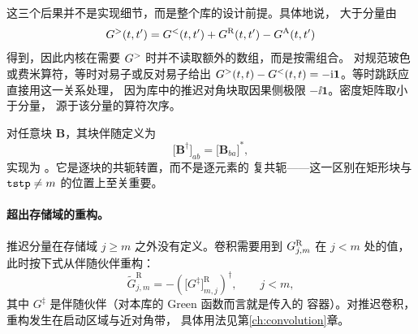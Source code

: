 这三个后果并不是实现细节，而是整个库的设计前提。具体地说，
大于分量由
\begin{equation}
    G^{>}(t,t') = G^{<}(t,t') + G^{\mathrm{R}}(t,t') - G^{\mathrm{A}}(t,t')
    \label{eq:greater-from-less-ret}
\end{equation}
得到，因此内核在需要 $G^{>}$ 时并不读取额外的数组，而是按需组合。
对规范玻色或费米算符，等时对易子或反对易子给出
$G^{>}(t,t)-G^{<}(t,t)=-\mathrm{i}\bm{1}$。等时跳跃应直接用这一关系处理，
因为库中的推迟对角块取因果侧极限 $-\ii\bm{1}$。密度矩阵取小于分量，
源于该分量的算符次序。

对任意块 $\bm{B}$，其块伴随定义为
\begin{equation}
    \big[\bm{B}^{\dagger}\big]_{ab} = \big[\bm{B}_{ba}\big]^{*},
    \label{eq:adjoint-block}
\end{equation}
实现为 。它是逐块的共轭转置，而不是逐元素的
复共轭——这一区别在矩形块与 $\texttt{tstp}\neq m$ 的位置上至关重要。

\paragraph{超出存储域的重构。}
推迟分量在存储域 $j\ge m$ 之外没有定义。卷积需要用到
$G^{\mathrm{R}}_{j,m}$ 在 $j<m$ 处的值，此时按下式从伴随伙伴重构：
\begin{equation}
    \tilde{G}^{\mathrm{R}}_{j,m}
    =
    -\left(\big[G^{\ddagger}\big]^{\mathrm{R}}_{m,j}\right)^{\dagger},
    \qquad j<m,
    \label{eq:tilde}
\end{equation}
其中 $G^{\ddagger}$ 是伴随伙伴（对本库的 Green 函数而言就是传入的
 容器）。对推迟卷积，重构发生在启动区域与近对角带，
具体用法见第\ref{ch:convolution}章。

